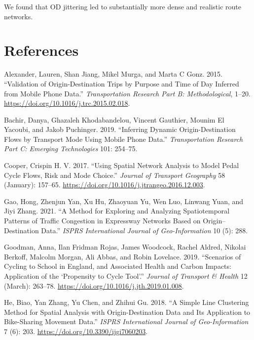 \documentclass[
]{article}
\newlength{\cslhangindent}
\newlength{\cslentryspacingunit} %
\newenvironment{CSLReferences}[2] %
 {%
  \setlength{\parindent}{0pt}
  \ifodd #1
  \let\oldpar\par
  \def\par{\hangindent=\cslhangindent\oldpar}
  \fi
  \setlength{\parskip}{#2\cslentryspacingunit}
 }%
 {}
\begin{document}
We found that OD jittering led to substantially more dense and realistic route networks.

\hypertarget{references}{%
\section*{References}\label{references}}

\hypertarget{refs}{}
\begin{CSLReferences}{1}{0}
\leavevmode{}%
Alexander, Lauren, Shan Jiang, Mikel Murga, and Marta C Gonz. 2015. {``Validation of Origin-Destination Trips by Purpose and Time of Day Inferred from Mobile Phone Data.''} \emph{Transportation Research Part B: Methodological}, 1--20. \url{https://doi.org/10.1016/j.trc.2015.02.018}.

\leavevmode{}%
Bachir, Danya, Ghazaleh Khodabandelou, Vincent Gauthier, Mounim El Yacoubi, and Jakob Puchinger. 2019. {``Inferring Dynamic Origin-Destination Flows by Transport Mode Using Mobile Phone Data.''} \emph{Transportation Research Part C: Emerging Technologies} 101: 254--75.

\leavevmode{}%
Cooper, Crispin H. V. 2017. {``Using Spatial Network Analysis to Model Pedal Cycle Flows, Risk and Mode Choice.''} \emph{Journal of Transport Geography} 58 (January): 157--65. \url{https://doi.org/10.1016/j.jtrangeo.2016.12.003}.

\leavevmode{}%
Gao, Hong, Zhenjun Yan, Xu Hu, Zhaoyuan Yu, Wen Luo, Linwang Yuan, and Jiyi Zhang. 2021. {``A {Method} for {Exploring} and {Analyzing Spatiotemporal Patterns} of {Traffic Congestion} in {Expressway Networks Based} on {Origin}--{Destination Data}.''} \emph{ISPRS International Journal of Geo-Information} 10 (5): 288.

\leavevmode{}%
Goodman, Anna, Ilan Fridman Rojas, James Woodcock, Rachel Aldred, Nikolai Berkoff, Malcolm Morgan, Ali Abbas, and Robin Lovelace. 2019. {``Scenarios of Cycling to School in {England}, and Associated Health and Carbon Impacts: Application of the {`{Propensity} to {Cycle Tool}'}.''} \emph{Journal of Transport \& Health} 12 (March): 263--78. \url{https://doi.org/10.1016/j.jth.2019.01.008}.

\leavevmode{}%
He, Biao, Yan Zhang, Yu Chen, and Zhihui Gu. 2018. {``A {Simple Line Clustering Method} for {Spatial Analysis} with {Origin}-{Destination Data} and {Its Application} to {Bike}-{Sharing Movement Data}.''} \emph{ISPRS International Journal of Geo-Information} 7 (6): 203. \url{https://doi.org/10.3390/ijgi7060203}.


\end{CSLReferences}
\end{document}
